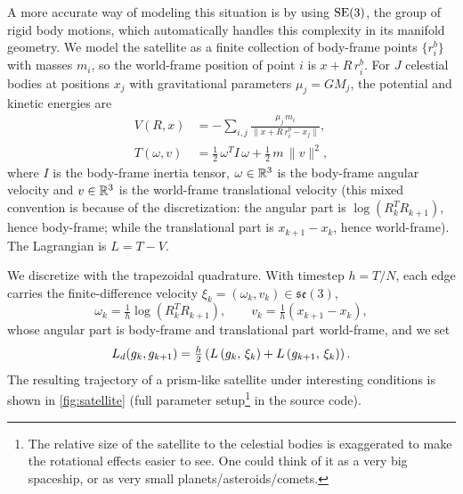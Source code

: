 A more accurate way of modeling this situation is by using $\mathrm{SE}(3)$, the group of rigid body motions, which automatically handles this complexity in its manifold geometry. We model the satellite as a finite collection of body-frame points $\{r_i^b\}$ with masses $m_i$, so the world-frame position of point $i$ is $x + R\, r_i^b$. For $J$ celestial bodies at positions $x_j$ with gravitational parameters $\mu_j = G M_j$, the potential and kinetic energies are
\begin{align*}
	V(R, x)      & = -\sum_{i, j} \frac{\mu_j\, m_i}{\|x + R\, r_i^b - x_j\|},       \\
	T(\omega, v) & = \tfrac{1}{2}\,\omega^T I\, \omega + \tfrac{1}{2}\, m\, \|v\|^2,
\end{align*}
where $I$ is the body-frame inertia tensor, $\omega \in {\mathbb{R}}^3$ is the body-frame angular velocity and $v \in {\mathbb{R}}^3$ is the world-frame translational velocity (this mixed convention is because of the discretization: the angular part is $\log(R_k^T R_{k+1})$, hence body-frame; while the translational part is $x_{k+1} - x_k$, hence world-frame). The Lagrangian is $L = T - V$.

We discretize with the trapezoidal quadrature. With timestep $h = T/N$, each edge carries the finite-difference velocity $\xi_k = (\omega_k, v_k) \in \mathfrak{se}(3)$,
\[
	\omega_k = \tfrac{1}{h}\log\!\left(R_k^T R_{k+1}\right),
	\qquad
	v_k = \tfrac{1}{h}\left(x_{k+1} - x_k\right),
\]
whose angular part is body-frame and translational part world-frame, and we set
\[
	L_d(g_k, g_{k+1}) = \tfrac{h}{2}\left(L\left(g_k,\, \xi_k\right) + L\left(g_{k+1},\, \xi_k\right)\right).
\]
The resulting trajectory of a prism-like satellite under interesting conditions is shown in \cref{fig:satellite} (full parameter setup\footnote{The relative size of the satellite to the celestial bodies is exaggerated to make the rotational effects easier to see. One could think of it as a very big spaceship, or as very small planets/asteroids/comets.} in the source code).

